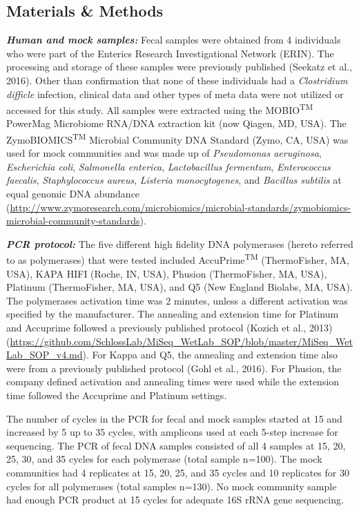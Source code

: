 \documentclass[11pt,]{article}
\begin{document}
\newpage

\subsection{Materials \& Methods}\label{materials-methods}

\textbf{\emph{Human and mock samples:}} Fecal samples were obtained from
4 individuals who were part of the Enterics Research Investigational
Network (ERIN). The processing and storage of these samples were
previously published (Seekatz et al., 2016). Other than confirmation
that none of these individuals had a \emph{Clostridium difficle}
infection, clinical data and other types of meta data were not utilized
or accessed for this study. All samples were extracted using the
MOBIO\textsuperscript{TM} PowerMag Microbiome RNA/DNA extraction kit
(now Qiagen, MD, USA). The ZymoBIOMICS\textsuperscript{TM} Microbial
Community DNA Standard (Zymo, CA, USA) was used for mock communities and
was made up of \emph{Pseudomonas aeruginosa}, \emph{Escherichia coli},
\emph{Salmonella enterica}, \emph{Lactobacillus fermentum},
\emph{Enterococcus faecalis}, \emph{Staphylococcus aureus},
\emph{Listeria monocytogenes}, and \emph{Bacillus subtilis} at equal
genomic DNA abundance
(\url{http://www.zymoresearch.com/microbiomics/microbial-standards/zymobiomics-microbial-community-standards}).

\textbf{\emph{PCR protocol:}} The five different high fidelity DNA
polymerases (hereto referred to as polymerases) that were tested
included AccuPrime\textsuperscript{TM} (ThermoFisher, MA, USA), KAPA
HIFI (Roche, IN, USA), Phusion (ThermoFisher, MA, USA), Platinum
(ThermoFisher, MA, USA), and Q5 (New England Biolabs, MA, USA). The
polymerases activation time was 2 minutes, unless a different activation
was specified by the manufacturer. The annealing and extension time for
Platinum and Accuprime followed a previously published protocol (Kozich
et al., 2013)
(\url{https://github.com/SchlossLab/MiSeq_WetLab_SOP/blob/master/MiSeq_WetLab_SOP_v4.md}).
For Kappa and Q5, the annealing and extension time also were from a
previously published protocol (Gohl et al., 2016). For Phusion, the
company defined activation and annealing times were used while the
extension time followed the Accuprime and Platinum settings.

The number of cycles in the PCR for fecal and mock samples started at 15
and increased by 5 up to 35 cycles, with amplicons used at each 5-step
increase for sequencing. The PCR of fecal DNA samples consisted of all 4
samples at 15, 20, 25, 30, and 35 cycles for each polymerase (total
sample n=100). The mock communities had 4 replicates at 15, 20, 25, and
35 cycles and 10 replicates for 30 cycles for all polymerases (total
samples n=130). No mock community sample had enough PCR product at 15
cycles for adequate 16S rRNA gene sequencing.
\end{document}
